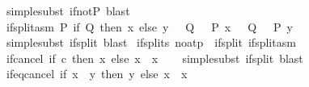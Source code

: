 \begin{isabellebody}
\ {\isacharparenleft}{\kern0pt}simplesubst\ if{\isacharunderscore}{\kern0pt}not{\isacharunderscore}{\kern0pt}P{\isacharparenright}{\kern0pt}\ blast{\isacharplus}{\kern0pt}\isanewline
{}\isamarkupfalse%
%
\endisatagproof
{\isafoldproof}%
%
\isadelimproof
\isanewline
%
\endisadelimproof
\isanewline
{}\isamarkupfalse%
\ if{\isacharunderscore}{\kern0pt}split{\isacharunderscore}{\kern0pt}asm{\isacharcolon}{\kern0pt}\ {\isachardoublequoteopen}P\ {\isacharparenleft}{\kern0pt}if\ Q\ then\ x\ else\ y{\isacharparenright}{\kern0pt}\ {\isacharequal}{\kern0pt}\ {\isacharparenleft}{\kern0pt}{\isasymnot}\ {\isacharparenleft}{\kern0pt}{\isacharparenleft}{\kern0pt}Q\ {\isasymand}\ {\isasymnot}\ P\ x{\isacharparenright}{\kern0pt}\ {\isasymor}\ {\isacharparenleft}{\kern0pt}{\isasymnot}\ Q\ {\isasymand}\ {\isasymnot}\ P\ y{\isacharparenright}{\kern0pt}{\isacharparenright}{\kern0pt}{\isacharparenright}{\kern0pt}{\isachardoublequoteclose}\isanewline
%
\isadelimproof
\ \ %
\endisadelimproof
%
\isatagproof
{}\isamarkupfalse%
\ {\isacharparenleft}{\kern0pt}simplesubst\ if{\isacharunderscore}{\kern0pt}split{\isacharparenright}{\kern0pt}\ blast%
\endisatagproof
{\isafoldproof}%
%
\isadelimproof
\isanewline
%
\endisadelimproof
\isanewline
{}\isamarkupfalse%
\ if{\isacharunderscore}{\kern0pt}splits\ {\isacharbrackleft}{\kern0pt}no{\isacharunderscore}{\kern0pt}atp{\isacharbrackright}{\kern0pt}\ {\isacharequal}{\kern0pt}\ if{\isacharunderscore}{\kern0pt}split\ if{\isacharunderscore}{\kern0pt}split{\isacharunderscore}{\kern0pt}asm\isanewline
\isanewline
{}\isamarkupfalse%
\ if{\isacharunderscore}{\kern0pt}cancel{\isacharcolon}{\kern0pt}\ {\isachardoublequoteopen}{\isacharparenleft}{\kern0pt}if\ c\ then\ x\ else\ x{\isacharparenright}{\kern0pt}\ {\isacharequal}{\kern0pt}\ x{\isachardoublequoteclose}\isanewline
%
\isadelimproof
\ \ %
\endisadelimproof
%
\isatagproof
{}\isamarkupfalse%
\ {\isacharparenleft}{\kern0pt}simplesubst\ if{\isacharunderscore}{\kern0pt}split{\isacharparenright}{\kern0pt}\ blast%
\endisatagproof
{\isafoldproof}%
%
\isadelimproof
\isanewline
%
\endisadelimproof
\isanewline
{}\isamarkupfalse%
\ if{\isacharunderscore}{\kern0pt}eq{\isacharunderscore}{\kern0pt}cancel{\isacharcolon}{\kern0pt}\ {\isachardoublequoteopen}{\isacharparenleft}{\kern0pt}if\ x\ {\isacharequal}{\kern0pt}\ y\ then\ y\ else\ x{\isacharparenright}{\kern0pt}\ {\isacharequal}{\kern0pt}\ x{\isachardoublequoteclose}\isanewline
%
\isadelimproof
\ \ %
\endisadelimproof
%
\isatagproof
{}\isamarkupfalse%

\end{isabellebody}
